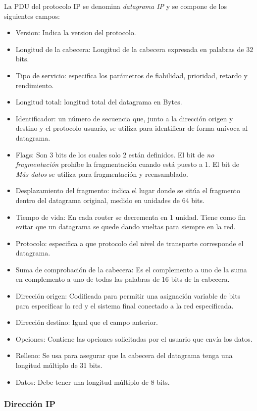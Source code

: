 La PDU del protocolo IP se denomina \textit{datagrama IP} y se compone de los siguientes campos:
\begin{itemize}
	\item Version: Indica la version del protocolo.
	\item Longitud de la cabecera: Longitud de la cabecera expresada en palabras de 32 bits.
	\item Tipo de servicio: especifica los parámetros de fiabilidad, prioridad, retardo y rendimiento.
	\item Longitud total: longitud total del datagrama en Bytes.
	\item Identificador: un número de secuencia que, junto a la dirección origen y destino y el protocolo usuario, se utiliza para identificar de forma unívoca al datagrama.
	\item Flags: Son 3 bits de los cuales solo 2 están definidos. El bit de \textit{no fragmentación} prohíbe la fragmentación cuando está puesto a 1. El bit de \textit{Más datos} se utiliza para fragmentación y reensamblado.
	\item Desplazamiento del fragmento: indica el lugar donde se sitúa el fragmento dentro del datagrama original, medido en unidades de 64 bits.
	\item Tiempo de vida: En cada router se decrementa en 1 unidad. Tiene como fin evitar que un datagrama se quede dando vueltas para siempre en la red.
	\item Protocolo: especifica a que protocolo del nivel de transporte corresponde el datagrama.
	\item Suma de comprobación de la cabecera: Es el complemento a uno de la suma en complemento a uno de todas las palabras de 16 bits de la cabecera.
	\item Dirección origen: Codificada para permitir una asignación variable de bits para especificar la red y el sistema final conectado a la red especificada.
	\item Dirección destino: Igual que el campo anterior.
	\item Opciones: Contiene las opciones solicitadas por el usuario que envía los datos.
	\item Relleno: Se usa para asegurar que la cabecera del datagrama tenga una longitud múltiplo de 31 bits.
	\item Datos: Debe tener una longitud múltiplo de 8 bits.
\end{itemize}

\subsubsection{Dirección IP}

